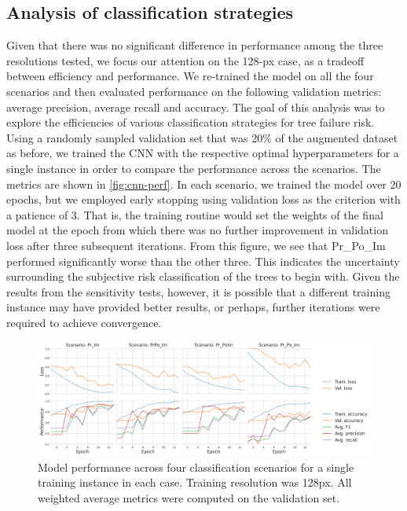 \documentclass[Journal,letterpaper, SingleSpace, InsideFigs]{ascelike-new}
\begin{document}
\subsection{Analysis of classification strategies}
Given that there was no significant difference in performance among the three resolutions tested, we focus our attention on the 128-px case, as a tradeoff between efficiency and performance. We re-trained the model on all the four scenarios and then evaluated performance on the following validation metrics: average precision, average recall and accuracy.
The goal of this analysis was to explore the efficiencies of various classification strategies for tree failure risk.
Using a randomly sampled validation set that was 20\% of the augmented dataset as before, we trained the CNN with the respective optimal hyperparameters for a single instance in order to compare the performance across the scenarios. The metrics are shown in \autoref{fig:cnn-perf}.
In each scenario, we trained the model over 20 epochs, but we employed early stopping using validation loss as the criterion with a patience of 3. That is, the training routine would set the weights of the final model at the epoch from which there was no further improvement in validation loss after three subsequent iterations. From this figure, we see that Pr\_Po\_Im performed significantly worse than the other three. This indicates the uncertainty surrounding the subjective risk classification of the trees to begin with. Given the results from the sensitivity tests, however, it is possible that a different training instance may have provided better results, or perhaps, further iterations were required to achieve convergence.

\begin{figure}[ht]
    \centering
    \includegraphics[width=1.05\textwidth]{cnn-performance-metrics-128px-plot}
    \caption{Model performance across four classification scenarios for a single training instance in each case. Training resolution was 128px. All weighted average metrics were computed on the validation set.}
    \label{fig:cnn-perf}
\end{figure}
\end{document}

